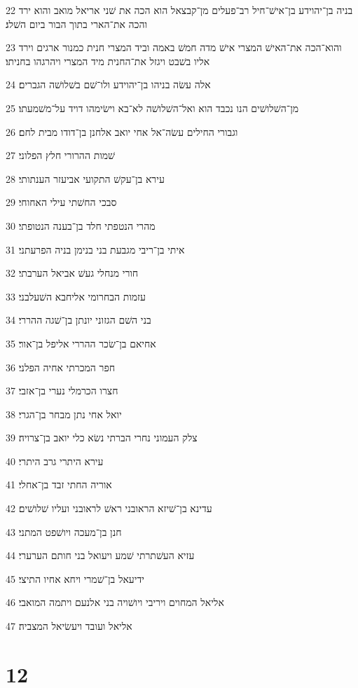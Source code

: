 \par 22 בניה בן־יהוידע בן־אישׁ־חיל רב־פעלים מן־קבצאל הוא הכה את שׁני אריאל מואב והוא ירד והכה את־הארי בתוך הבור ביום השׁלג׃
\par 23 והוא־הכה את־האישׁ המצרי אישׁ מדה חמשׁ באמה וביד המצרי חנית כמנור ארגים וירד אליו בשׁבט ויגזל את־החנית מיד המצרי ויהרגהו בחניתו׃
\par 24 אלה עשׂה בניהו בן־יהוידע ולו־שׁם בשׁלושׁה הגברים׃
\par 25 מן־השׁלושׁים הנו נכבד הוא ואל־השׁלושׁה לא־בא וישׂימהו דויד על־משׁמעתו׃
\par 26 וגבורי החילים עשׂה־אל אחי יואב אלחנן בן־דודו מבית לחם׃
\par 27 שׁמות ההרורי חלץ הפלוני׃
\par 28 עירא בן־עקשׁ התקועי אביעזר הענתותי׃
\par 29 סבכי החשׁתי עילי האחוחי׃
\par 30 מהרי הנטפתי חלד בן־בענה הנטופתי׃
\par 31 איתי בן־ריבי מגבעת בני בנימן בניה הפרעתני׃
\par 32 חורי מנחלי געשׁ אביאל הערבתי׃
\par 33 עזמות הבחרומי אליחבא השׁעלבני׃
\par 34 בני השׁם הגזוני יונתן בן־שׁגה ההררי׃
\par 35 אחיאם בן־שׂכר ההררי אליפל בן־אור׃
\par 36 חפר המכרתי אחיה הפלני׃
\par 37 חצרו הכרמלי נערי בן־אזבי׃
\par 38 יואל אחי נתן מבחר בן־הגרי׃
\par 39 צלק העמוני נחרי הברתי נשׂא כלי יואב בן־צרויה׃
\par 40 עירא היתרי גרב היתרי׃
\par 41 אוריה החתי זבד בן־אחלי׃
\par 42 עדינא בן־שׁיזא הראובני ראשׁ לראובני ועליו שׁלושׁים׃
\par 43 חנן בן־מעכה ויושׁפט המתני׃
\par 44 עזיא העשׁתרתי שׁמע ויעואל בני חותם הערערי׃
\par 45 ידיעאל בן־שׁמרי ויחא אחיו התיצי׃
\par 46 אליאל המחוים ויריבי ויושׁויה בני אלנעם ויתמה המואבי׃
\par 47 אליאל ועובד ויעשׂיאל המצביה׃

\chapter{12}

